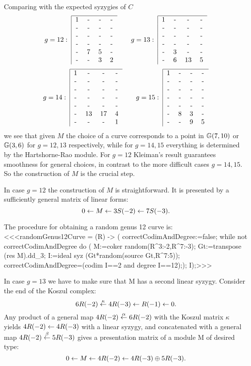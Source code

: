 \medskip
Comparing with the expected syzygies of $C$ 
$$g=12: \;
\begin{tabular}{|cccc}\hline
 1 & - & - & -  \cr
 - & - & - & -  \cr
 - & - & - & -  \cr
 - & - & - & -  \cr
 - & 7 & 5 & - \cr
 - & - & 3 & 2  \cr
\end{tabular}
\qquad
g=13: \;
\begin{tabular}{|cccc}\hline
 1 & - & - & -  \cr
 - & - & - & -  \cr
 - & - & - & -  \cr
 - & - & - & -  \cr
 - & 3 & - & - \cr
 - & 6 & 13 & 5  \cr
\end{tabular}
$$
\medskip
$$g=14: \;
\begin{tabular}{|cccc}\hline
 1 & - & - & -  \cr
 - & - & - & -  \cr
 - & - & - & -  \cr 
- & - & - & -  \cr 
- & - & - & -  \cr
 - & 13 & 17 & 4  \cr
 - & - & - & 1 \cr
\end{tabular}
\qquad
g=15: \;
\begin{tabular}{|cccc}
\hline
 1 & - & - & -  \cr 
 - & - & - & -  \cr
- & - & - & -  \cr
 - & - & - & -  \cr
 - & - & - & -  \cr
 - & 8 & 3 & -  \cr
 - & - & 9 & 5 \cr
\end{tabular}
$$
we see that given  $M$ the choice of a curve corresponds to a point
in ${\mathbb G}(7,10)$ or ${\mathbb G}(3,6)$ for $g=12,13$ respectively, 
while for $g=14,15$ everything is determined by the Hartshorne-Rao module. 
For $g=12$ Kleiman's result guarantees smoothness for general choices,
in contrast to the more difficult cases $g=14,15$. 
So the construction of $M$ is the crucial step. 




In case $g=12$ the construction of $M$ is straightforward. 
It is presented by a sufficiently general matrix of linear forms:
$$0 \leftarrow M \leftarrow 3S(-2) \leftarrow 7S(-3).$$

\noindent
The procedure for obtaining a random genus 12 curve is:
<<<randomGenus12Curve = (R) -> (
     correctCodimAndDegree:=false;
     while not correctCodimAndDegree do (
          M:=coker random(R^{3:-2},R^{7:-3});
          Gt:=transpose (res M).dd_3;
          I:=ideal syz (Gt*random(source Gt,R^{7:5}));
          correctCodimAndDegree=(codim I==2 and degree I==12););
     I);>>>


\medskip
In case $g=13$ we have to make sure that M has a second linear syzygy. 
Consider the end of the Koszul complex:
$$6R(-2) \stackrel{\kappa}{\leftarrow} 4R(-3) \leftarrow R(-1) \leftarrow 0.$$
Any product of a general map $4R(-2) \stackrel{\alpha}{\leftarrow} 6R(-2)$ with 
the Koszul matrix $\kappa$ yields
$4R(-2) \leftarrow 4R(-3)$ with a linear syzygy, 
and concatenated with a general map $4R(-2) \stackrel{\beta}{\leftarrow} 5R(-3)$
gives a presentation matrix of a module M of desired type:
$$ 0 \leftarrow M \leftarrow 4R(-2) \leftarrow 4R(-3) \oplus 5R(-3).$$

